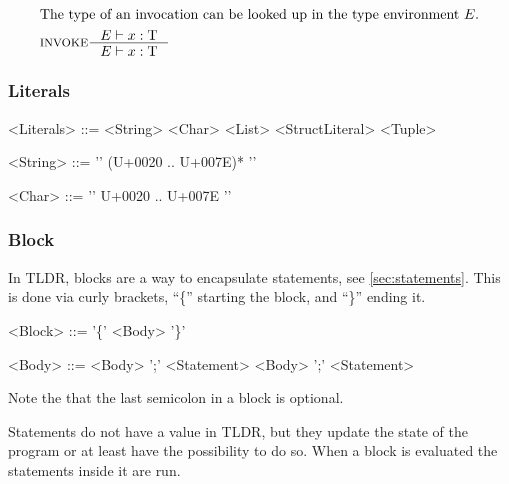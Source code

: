 \begin{align*}
\intertext{The type of an invocation can be looked up in the type environment $E$.}
&\inference[INVOKE]{\Tenv x: \Tt}
                 {\Tenv x: \Tt}
\end{align*}

\subsubsection{Literals}

\begin{grammar}
<Literals> ::= <String>
 \alt <Char>
 \alt <List>
 \alt <StructLiteral>
 \alt <Tuple>

<String> ::= '\textquotedbl' (U+0020 .. U+007E)* '\textquotedbl'

<Char> ::= '\textquotesingle' U+0020 .. U+007E '\textquotesingle'
\end{grammar}

\subsubsection{Block}
In TLDR, blocks are a way to encapsulate statements, see \cref{sec:statements}. This is done via curly brackets, \enquote{\{} starting the block, and \enquote{\}} ending it.

\begin{grammar}
<Block> ::= '\{' <Body> '\}'

<Body> ::= <Body> ';' <Statement>
 \alt <Body> ';'
 \alt <Statement>
\end{grammar}

Note the that the last semicolon in a block is optional.

Statements do not have a value in TLDR, but they update the state of the program or at least have the possibility to do so. When a block is evaluated the statements inside it are run.

